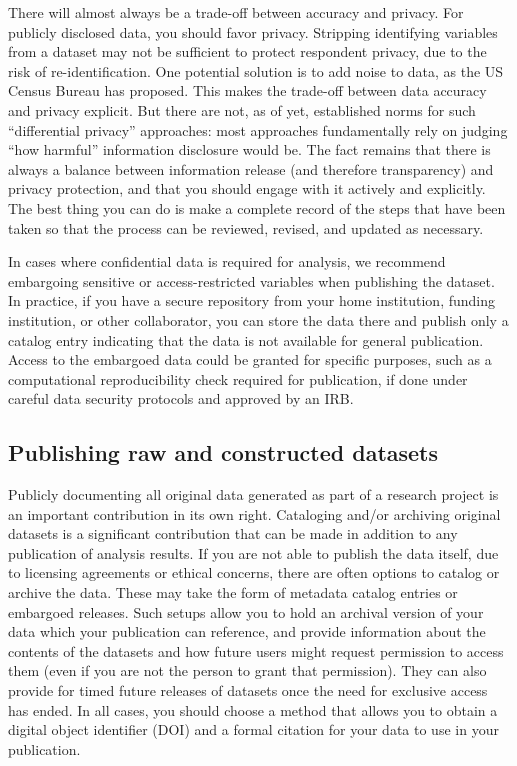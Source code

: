 There will almost always be a trade-off between accuracy and privacy.
For publicly disclosed data, you should favor privacy.
Stripping identifying variables from a dataset may not be sufficient to protect respondent privacy,
due to the risk of re-identification.
One potential solution is to add noise to data, as the US Census Bureau has proposed.\cite{abowd2018us}
This makes the trade-off between data accuracy and privacy explicit.
But there are not, as of yet, established norms for such ``differential privacy'' approaches:
most approaches fundamentally rely on judging ``how harmful'' information disclosure would be.
The fact remains that there is always a balance between information release (and therefore transparency)
and privacy protection, and that you should engage with it actively and explicitly.
The best thing you can do is make a complete record of the steps that have been taken
so that the process can be reviewed, revised, and updated as necessary.

In cases where confidential data is required for analysis,
we recommend embargoing sensitive or access-restricted variables when publishing the dataset.
In practice, if you have a secure repository from your
home institution, funding institution, or other collaborator,
you can store the data there
and publish only a catalog entry
indicating that the data is not available for general publication.
Access to the embargoed data could be granted for specific purposes,
such as a computational reproducibility check required for publication,
if done under careful data security protocols and approved by an IRB.

\subsection{Publishing raw and constructed datasets}

Publicly documenting all original data generated as part of a research project
is an important contribution in its own right.
Cataloging and/or archiving original datasets
is a significant contribution that can be made
in addition to any publication of analysis results.
If you are not able to publish the data itself,
due to licensing agreements or ethical concerns,
there are often options to catalog or archive the data.
These may take the form of metadata catalog entries or embargoed releases.
Such setups allow you to hold an archival version of your data
which your publication can reference,
and provide information about the contents of the datasets
and how future users might request permission to access them
(even if you are not the person to grant that permission).
They can also provide for timed future releases of datasets
once the need for exclusive access has ended.
In all cases, you should choose a method that allows you
to obtain a digital object identifier (DOI)
and a formal citation for your data to use in your publication.

